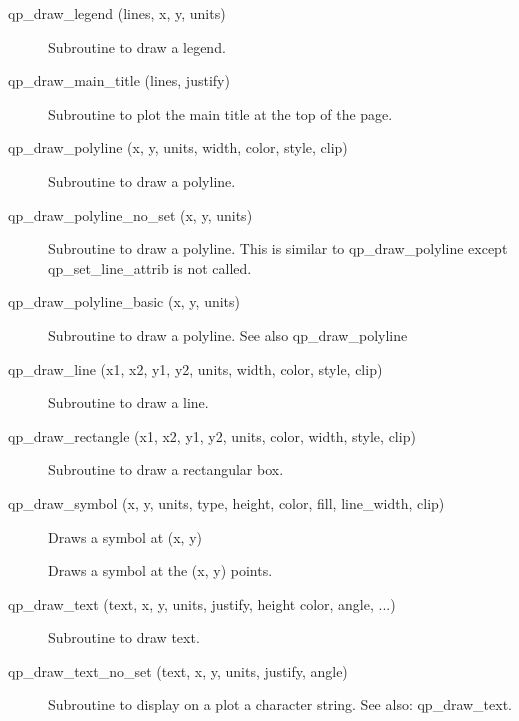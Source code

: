 \begin{description}
\item[qp_draw_legend (lines, x, y, units)] \Newline 
     Subroutine to draw a legend.

\item[qp_draw_main_title (lines, justify)] \Newline 
     Subroutine to plot the main title at the top of the page.

\item[qp_draw_polyline (x, y, units, width, color, style, clip)] \Newline 
     Subroutine to draw a polyline.

\item[qp_draw_polyline_no_set (x, y, units)] \Newline 
Subroutine to draw a polyline.
This is similar to qp_draw_polyline except qp_set_line_attrib is not called.

\item[qp_draw_polyline_basic (x, y, units) ] \Newline 
     Subroutine to draw a polyline. See also qp_draw_polyline

\item[qp_draw_line (x1, x2, y1, y2, units, width, color, style, clip)] \Newline 
     Subroutine to draw a line.

\item[qp_draw_rectangle (x1, x2, y1, y2, units, color, width,
                                             style, clip) ] \Newline 
     Subroutine to draw a rectangular box.

\item[qp_draw_symbol (x, y, units, type, height, color, fill, line_width, clip)] \Newline 
     Draws a symbol at (x, y) 

\item[\protect\parbox{6in}{qp_draw_symbols (x, y, units, type, height, color, \\
  \hspace*{2in} fill, line_width, clip, symbol_every)} ] \Newline 
     Draws a symbol at the (x, y) points. 

\item[qp_draw_text (text, x, y, units, justify, height
        color, angle, ...) ] \Newline 
     Subroutine to draw text.

\item[qp_draw_text_no_set (text, x, y, units, justify, angle)] \Newline 
Subroutine to display on a plot a character string.
See also: qp_draw_text.


\end{description}
